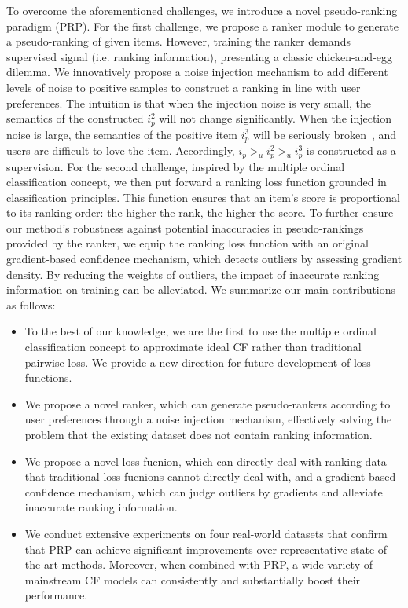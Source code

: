 To overcome the aforementioned challenges, we introduce a novel pseudo-ranking paradigm (PRP). For the first challenge, we propose a ranker module to generate a pseudo-ranking of given items. However, training the ranker demands supervised signal (i.e. ranking information), presenting a classic chicken-and-egg dilemma. We innovatively propose a noise injection mechanism to add different levels of noise to positive samples to construct a ranking in line with user preferences. The intuition is that when the injection noise is very small, the semantics of the constructed $i_p^2$ will not change significantly. When the injection noise is large, the semantics of the positive item $i_p^3$ will be seriously broken~\cite{HHD18,ZPL23}, and users are difficult to love the item. Accordingly, $i_p >_u i_p^2 >_u i_p^3$ is constructed as a supervision. For the second challenge, inspired by the multiple ordinal classification concept, we then put forward a ranking loss function grounded in classification principles. This function ensures that an item's score is proportional to its ranking order: the higher the rank, the higher the score. To further ensure our method's robustness against potential inaccuracies in pseudo-rankings provided by the ranker, we equip the ranking loss function with an original gradient-based confidence mechanism, which detects outliers by assessing gradient density. By reducing the weights of outliers, the impact of inaccurate ranking information on training can be alleviated. We summarize our main contributions as follows:
\begin{itemize}
    \item To the best of our knowledge, we are the first to use the multiple ordinal classification concept to approximate ideal CF rather than traditional pairwise loss. We provide a new direction for future development of loss functions.
    \item We propose a novel ranker, which can generate pseudo-rankers according to user preferences through a noise injection mechanism, effectively solving the problem that the existing dataset does not contain ranking information.
    \item We propose a novel loss fucnion, which can directly deal with ranking data that traditional loss fucnions cannot directly deal with, and a gradient-based confidence mechanism, which can judge outliers by gradients and alleviate inaccurate ranking information.
    \item We conduct extensive experiments on four real-world datasets that confirm that PRP can achieve significant improvements over representative state-of-the-art methods. Moreover, when combined with PRP, a wide variety of mainstream CF models can consistently and substantially boost their performance. 
\end{itemize}
